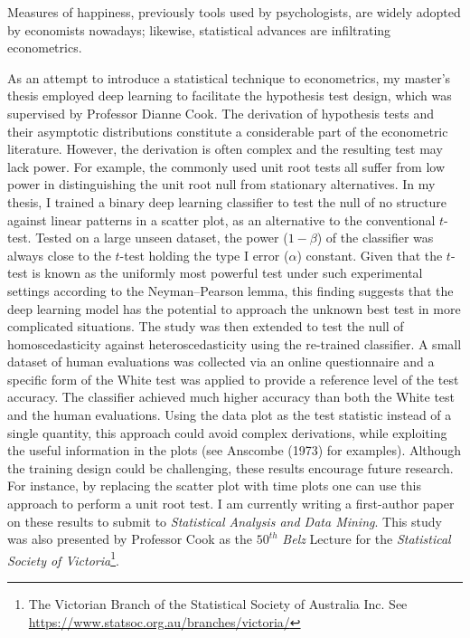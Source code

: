 \documentclass[12pt,]{article}
\let\rmarkdownfootnote\footnote%
\def\footnote{\protect\rmarkdownfootnote}
\begin{document}
Measures of happiness, previously tools used by psychologists, are
widely adopted by economists nowadays; likewise, statistical advances
are infiltrating econometrics.

As an attempt to introduce a statistical technique to econometrics, my
master's thesis employed deep learning to facilitate the hypothesis test
design, which was supervised by Professor Dianne Cook. The derivation of
hypothesis tests and their asymptotic distributions constitute a
considerable part of the econometric literature. However, the derivation
is often complex and the resulting test may lack power. For example, the
commonly used unit root tests all suffer from low power in
distinguishing the unit root null from stationary alternatives. In my
thesis, I trained a binary deep learning classifier to test the null of
no structure against linear patterns in a scatter plot, as an
alternative to the conventional \(t\)-test. Tested on a large unseen
dataset, the power (\(1-\beta\)) of the classifier was always close to
the \(t\)-test holding the type I error (\(\alpha\)) constant. Given
that the \(t\)-test is known as the uniformly most powerful test under
such experimental settings according to the Neyman--Pearson lemma, this
finding suggests that the deep learning model has the potential to
approach the unknown best test in more complicated situations. The study
was then extended to test the null of homoscedasticity against
heteroscedasticity using the re-trained classifier. A small dataset of
human evaluations was collected via an online questionnaire and a
specific form of the White test was applied to provide a reference level
of the test accuracy. The classifier achieved much higher accuracy than
both the White test and the human evaluations. Using the data plot as
the test statistic instead of a single quantity, this approach could
avoid complex derivations, while exploiting the useful information in
the plots (see Anscombe (1973) for examples). Although the training
design could be challenging, these results encourage future research.
For instance, by replacing the scatter plot with time plots one can use
this approach to perform a unit root test. I am currently writing a
first-author paper on these results to submit to \emph{Statistical
Analysis and Data Mining}. This study was also presented by Professor
Cook as the \(50^{th}\) \emph{Belz} Lecture for the \emph{Statistical
Society of Victoria}\footnote{The Victorian Branch of the Statistical
  Society of Australia Inc. See
  \url{https://www.statsoc.org.au/branches/victoria/}}.
\end{document}
